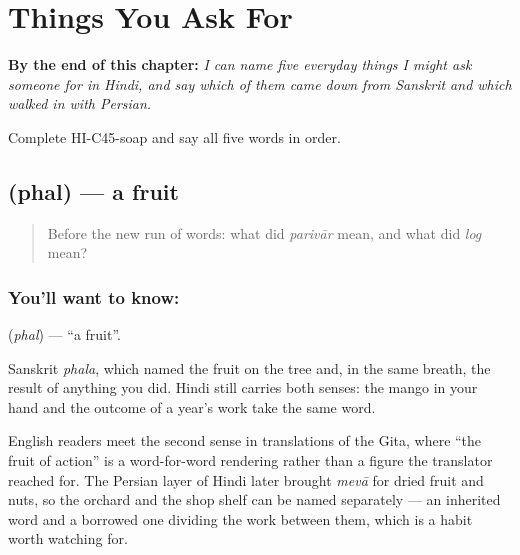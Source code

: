 
\chapter{Things You Ask For}
\label{ch:hi-ask-for}

\begin{chapteropening}
\textbf{By the end of this chapter:} \emph{I can name five everyday things I might ask someone for in Hindi, and say which of them came down from Sanskrit and which walked in with Persian.}

Complete HI-C45-soap and say all five words in order.
\end{chapteropening}

\section[\texorpdfstring{\hi{फल} (phal)}{फल (phal)}]{ (phal) — a fruit}

\label{lesson:HI-C45-fruit}



\begin{quote}
Before the new run of words: what did \emph{parivār} mean, and what did \emph{log} mean?
\end{quote}

\subsection*{You'll want to know: }
\textbf{} (\emph{phal}) — \textquotedblleft{}a fruit\textquotedblright{}.

Sanskrit \emph{phala}, which named the fruit on the tree and, in the same breath, the result of anything you did. Hindi still carries both senses: the mango in your hand and the outcome of a year's work take the same word.

English readers meet the second sense in translations of the Gita, where \textquotedblleft{}the fruit of action\textquotedblright{} is a word-for-word rendering rather than a figure the translator reached for. The Persian layer of Hindi later brought \emph{mevā} for dried fruit and nuts, so the orchard and the shop shelf can be named separately — an inherited word and a borrowed one dividing the work between them, which is a habit worth watching for.

